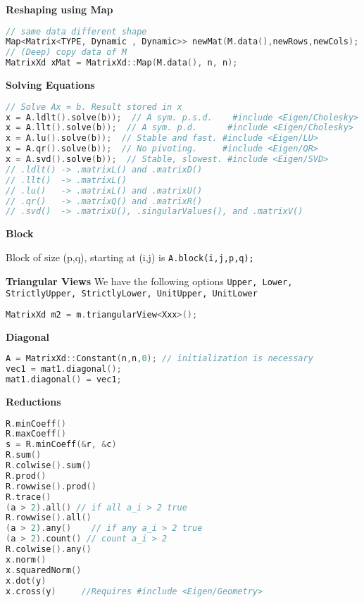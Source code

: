 \documentclass{sciposter}
\newcommand{\psection}[1]{\par \textbf{\large#1}}
\begin{document}
\begin{multicols}{2}
\psection{Reshaping using Map}
\begin{lstlisting}[language=C++]
// same data different shape
Map<Matrix<TYPE, Dynamic , Dynamic>> newMat(M.data(),newRows,newCols);
// (Deep) copy data of M
MatrixXd xMat = MatrixXd::Map(M.data(), n, n);
\end{lstlisting}


\psection{Solving Equations}
\begin{lstlisting}[language=C++]
// Solve Ax = b. Result stored in x
x = A.ldlt().solve(b));  // A sym. p.s.d.    #include <Eigen/Cholesky>
x = A.llt().solve(b));  // A sym. p.d.      #include <Eigen/Cholesky>
x = A.lu().solve(b));  // Stable and fast. #include <Eigen/LU>
x = A.qr().solve(b));  // No pivoting.     #include <Eigen/QR>
x = A.svd().solve(b));  // Stable, slowest. #include <Eigen/SVD>
// .ldlt() -> .matrixL() and .matrixD()
// .llt()  -> .matrixL()
// .lu()   -> .matrixL() and .matrixU()
// .qr()   -> .matrixQ() and .matrixR()
// .svd()  -> .matrixU(), .singularValues(), and .matrixV()
\end{lstlisting}

\psection{Block}

Block of size (p,q), starting at (i,j) is \texttt{A.block(i,j,p,q);}


\psection{Triangular Views}
We have the following options \texttt{Upper, Lower, StrictlyUpper, StrictlyLower, UnitUpper, UnitLower}
\begin{lstlisting}[language=C++]
MatrixXd m2 = m.triangularView<Xxx>();
\end{lstlisting}

\psection{Diagonal}
\begin{lstlisting}[language=C++]
A = MatrixXd::Constant(n,n,0); // initialization is necessary
vec1 = mat1.diagonal();
mat1.diagonal() = vec1;
\end{lstlisting}

\psection{Reductions}
\begin{lstlisting}[language=C++]
R.minCoeff()              
R.maxCoeff()              
s = R.minCoeff(&r, &c)   
R.sum()                  
R.colwise().sum()      
R.prod()                
R.rowwise().prod()        
R.trace()                
(a > 2).all() // if all a_i > 2 true             
R.rowwise().all()     
(a > 2).any()    // if any a_i > 2 true        
(a > 2).count() // count a_i > 2 
R.colwise().any()  
x.norm()                 
x.squaredNorm()       
x.dot(y)                 
x.cross(y)     //Requires #include <Eigen/Geometry>
\end{lstlisting}





\end{multicols}
\end{document}
